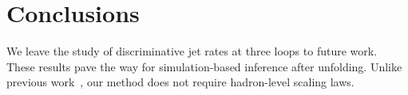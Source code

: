 \section{Conclusions}\label{sec:conclusions}

We leave the study of discriminative jet rates at three loops to future
work. These results pave the way for simulation-based inference after
unfolding. Unlike previous
work~\cite{TPC:2356-Fast-and-Accurate-Zero-Bin-Subtractions-with-Effective-Theories-September-27-2026},
our method does not require hadron-level scaling laws.

